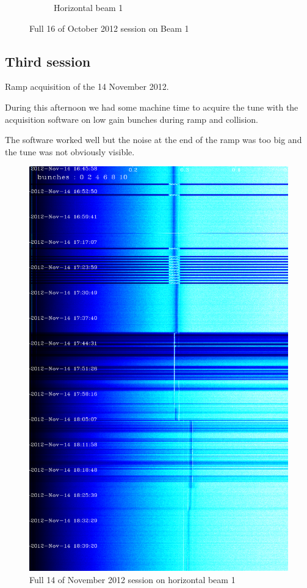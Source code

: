 \begin{figure}[H]
\begin{subfigure}{.5\textwidth}
  \caption{Horizontal beam 1}
\end{subfigure}
\caption{Full 16 of October 2012 session on Beam 1}
\end{figure}

\subsection{Third session}

Ramp acquisition of the 14 November 2012. 

During this afternoon we had some machine time to acquire the tune with the acquisition software on low gain bunches during ramp and collision.

The software worked well but the noise at the end of the ramp was too big and the tune was not obviously visible.

\begin{figure}[H]
\centering
\caption{Full 14 of November 2012 session on horizontal beam 1}
\includegraphics[scale=0.3]{md-121114-hb1-bunches111111-16.png}
\end{figure}

